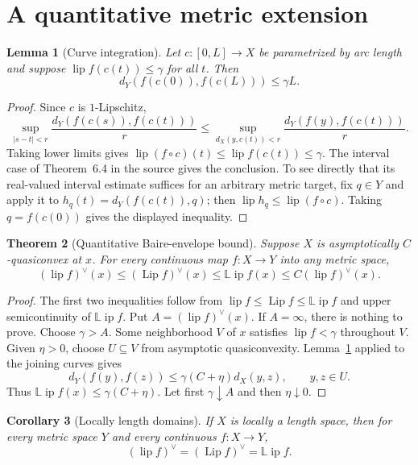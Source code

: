 \documentclass[11pt]{article}
\newtheorem{theorem}{Theorem}
\newtheorem{lemma}[theorem]{Lemma}
\newtheorem{corollary}[theorem]{Corollary}
\theoremstyle{definition}
\newcommand{\lipf}{\operatorname{lip}}
\newcommand{\Lipf}{\operatorname{Lip}}
\newcommand{\LLip}{\mathbb L\!\operatorname{ip}}
\begin{document}
\section{A quantitative metric extension}

\begin{lemma}[Curve integration]\label{lem:curve}
Let $c:[0,L]\to X$ be parametrized by arc length and suppose
$\lipf f(c(t))\leq\gamma$ for all $t$.  Then
\[
 d_Y(f(c(0)),f(c(L)))\leq\gamma L.
\]
\end{lemma}

\begin{proof}
Since $c$ is $1$-Lipschitz,
\[
 \sup_{|s-t|<r}\frac{d_Y(f(c(s)),f(c(t)))}r
 \leq
 \sup_{d_X(y,c(t))<r}\frac{d_Y(f(y),f(c(t)))}r.
\]
Taking lower limits gives
$\lipf(f\circ c)(t)\leq\lipf f(c(t))\leq\gamma$.  The interval case of
Theorem~6.4 in the source gives the conclusion.  To see directly that its
real-valued interval estimate suffices for an arbitrary metric target, fix
$q\in Y$ and apply it to
$h_q(t)=d_Y(f(c(t)),q)$; then $\lipf h_q\leq\lipf(f\circ c)$.  Taking
$q=f(c(0))$ gives the displayed inequality.
\end{proof}

\begin{theorem}[Quantitative Baire-envelope bound]\label{thm:quant}
Suppose $X$ is asymptotically $C$-quasiconvex at $x$.  For every continuous
map $f:X\to Y$ into any metric space,
\begin{equation}
 (\lipf f)^\vee(x)\leq(\Lipf f)^\vee(x)\leq\LLip f(x)
 \leq C(\lipf f)^\vee(x).                                  \tag{1}
\end{equation}
\end{theorem}

\begin{proof}
The first two inequalities follow from
$\lipf f\leq\Lipf f\leq\LLip f$ and upper semicontinuity of $\LLip f$.
Put $A=(\lipf f)^\vee(x)$.  If $A=\infty$, there is nothing to prove.
Choose $\gamma>A$.  Some neighborhood $V$ of $x$ satisfies
$\lipf f<\gamma$ throughout $V$.  Given $\eta>0$, choose $U\subseteq V$
from asymptotic quasiconvexity.  Lemma~\ref{lem:curve} applied to the joining
curves gives
\[
 d_Y(f(y),f(z))\leq\gamma(C+\eta)d_X(y,z),\qquad y,z\in U.
\]
Thus $\LLip f(x)\leq\gamma(C+\eta)$.  Let first
$\gamma\downarrow A$ and then $\eta\downarrow0$.
\end{proof}

\begin{corollary}[Locally length domains]\label{cor:length}
If $X$ is locally a length space, then for every metric space $Y$ and every
continuous $f:X\to Y$,
\[
 (\lipf f)^\vee=(\Lipf f)^\vee=\LLip f.
\]
\end{corollary}
\end{document}
